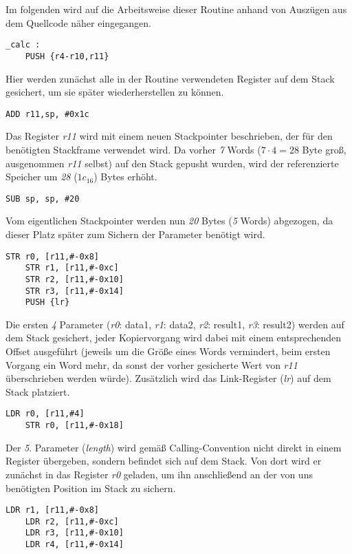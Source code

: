 \documentclass[11pt]{scrartcl}
\begin{document}
Im folgenden wird auf die Arbeitsweise dieser Routine anhand von Auszügen aus dem Quellcode näher eingegangen.
\begin{lstlisting}[language={[x86masm]Assembler}]
_calc :
	PUSH {r4-r10,r11}
\end{lstlisting}
Hier werden zunächst alle in der Routine verwendeten Register auf dem Stack gesichert, um sie später wiederherstellen zu können.
\\
\begin{lstlisting}[language={[x86masm]Assembler}]
	ADD r11,sp, #0x1c
\end{lstlisting}
Das Register \emph{r11} wird mit einem neuen Stackpointer beschrieben, der für den benötigten Stackframe verwendet wird. Da vorher \emph{7} Words ($7 \cdot 4 = 28$ Byte groß, ausgenommen \emph{r11} selbst) auf den Stack gepusht wurden, wird der referenzierte Speicher um \emph{28} ($1c_{16}$) Bytes erhöht. 
\\
\begin{lstlisting}[language={[x86masm]Assembler}]
	SUB sp, sp, #20
\end{lstlisting}
Vom eigentlichen Stackpointer werden nun \emph{20} Bytes (\emph{5} Words) abgezogen, da dieser Platz später zum Sichern der Parameter benötigt wird.
\\
\begin{lstlisting}[language={[x86masm]Assembler}]
	STR r0, [r11,#-0x8]
	STR r1, [r11,#-0xc]
	STR r2, [r11,#-0x10]
	STR r3, [r11,#-0x14]
	PUSH {lr}
\end{lstlisting}
Die ersten \emph{4} Parameter (\emph{r0}: data1, \emph{r1}: data2, \emph{r2}: result1, \emph{r3}: result2) werden auf dem Stack gesichert, jeder Kopiervorgang wird dabei mit einem entsprechenden Offset ausgeführt (jeweils um die Größe eines Words vermindert, beim ersten Vorgang ein Word mehr, da sonst der vorher gesicherte Wert von \emph{r11} überschrieben werden würde). Zusätzlich wird das Link-Register (\emph{lr}) auf dem Stack platziert.
\\
\begin{lstlisting}[language={[x86masm]Assembler}]
	LDR r0, [r11,#4]
	STR r0, [r11,#-0x18]
\end{lstlisting}
Der \emph{5}. Parameter (\emph{length}) wird gemäß Calling-Convention nicht direkt in einem Register übergeben, sondern befindet sich auf dem Stack. Von dort wird er zunächst in das Register \emph{r0} geladen, um ihn anschließend an der von uns benötigten Position im Stack zu sichern.
\begin{lstlisting}[language={[x86masm]Assembler}]
	LDR r1, [r11,#-0x8]
	LDR r2, [r11,#-0xc]
	LDR r3, [r11,#-0x10]
	LDR r4, [r11,#-0x14]
\end{lstlisting}
\end{document}
